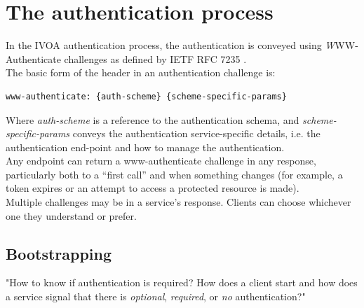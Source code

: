 \documentclass[11pt,a4paper]{ivoa}
\begin{document}
\section{The authentication process}

In the IVOA authentication process, the authentication is conveyed
using {\emph WWW-Authenticate} challenges as defined by
IETF RFC 7235 \citep{rfc7235}.\\
The basic form of the header in an authentication challenge is:

\begin{verbatim}
www-authenticate: {auth-scheme} {scheme-specific-params}
\end{verbatim}
Where \emph{auth-scheme} is a reference to the authentication 
schema,
and \emph{scheme-specific-params} conveys the authentication
service-specific details, i.e. the authentication end-point
and how to manage the authentication.\\
Any endpoint can return a www-authenticate challenge  
in any response, particularly both to a 
``first call'' and when something changes (for example, a token
expires or an attempt to access a protected resource is made).\\
Multiple challenges may be in a service's
response. Clients can choose whichever one they understand or prefer.

\subsection{Bootstrapping}
"How to know if authentication is required? 
How does a client start and how does a service signal 
that there is
\emph{optional}, \emph{required}, or \emph{no} authentication?"
\end{document}
